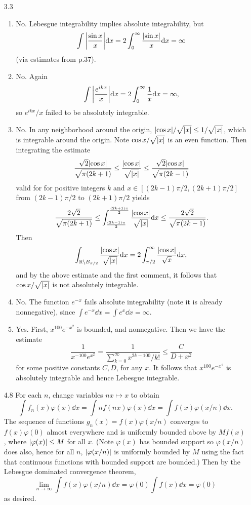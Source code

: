 \documentclass[11pt]{article}
\begin{document}
\begin{enumerate}
    \item[3.3] \begin{enumerate}
        \item No. Lebesgue integrability implies absolute integrability, but \[\int \abs{\frac{\sin x}{x}}\dd x = 2\int_0^\infty \frac{\abs{\sin x}}{x}\dd x = \infty\] (via estimates from p.37).
        \item No. Again \[\int \abs{\frac{e^{ikx}}{x}}\dd x = 2\int_0^\infty \frac{1}{x}\dd x=\infty ,\] so $e^{ikx}/x$ failed to be absolutely integrable.
        \item No. In any neighborhood around the origin, $\abs{ \cos x}/\sqrt{\abs{x}}\leq 1/\sqrt{\abs{x}}$, which is integrable around the origin. Note $\cos x/\sqrt{\abs{x}}$ is an even function. Then integrating the estimate \[\frac{\sqrt 2\abs{\cos x}}{\sqrt{\pi(2k+1)}}\leq \frac{\abs{\cos x}}{\sqrt{\abs{x}}}\leq \frac{\sqrt 2\abs{\cos x}}{\sqrt{\pi(2k-1)}}\] valid for for positive integers $k$ and $x\in [(2k-1)\pi/2,(2k+1)\pi/2]$ from $(2k-1)\pi/2$ to $(2k+1)\pi/2$ yields \[\frac{2\sqrt 2}{\sqrt{\pi(2k+1)}}\leq \int_{\frac{(2k-1)\pi}{2}}^{\frac{(2k+1)\pi}{2}}\frac{\abs{\cos x}}{\sqrt{\abs{x}}}\dd x\leq \frac{2\sqrt 2}{\sqrt{\pi(2k-1)}}.\] Then \[\int_{\mathbb{R}\setminus B_{\pi/2}} \frac{\abs{\cos x}}{\sqrt{\abs{x}}}\dd x = 2\int_{\pi/2}^\infty \frac{\abs{\cos x}}{\sqrt{x}}\dd x,\] and by the above estimate and the first comment, it follows that $\cos x /\sqrt{\abs{x}}$ is not absolutely integrable.
        \item No. The function $e^{-x}$ fails absolute integrability (note it is already nonnegative), since $\int e^{-x}\dd x = \int e^x \dd x = \infty$.
        \item Yes. First, $x^{100}e^{-x^2}$ is bounded, and nonnegative. Then we have the estimate \[\frac{1}{x^{-100}e^{x^2}} = \frac{1}{\sum_{k=0}^\infty x^{2k-100}/k!}\leq \frac{C}{D+x^2}\] for some positive constants $C,D$, for any $x$. It follows that $x^{100}e^{-x^2}$ is absolutely integrable and hence Lebesgue integrable.
    \end{enumerate}
    \item[4.8] For each $n$, change variables $nx\mapsto x$ to obtain \[\int f_n(x)\varphi(x)\dd x = \int nf(nx)\varphi(x)\dd x = \int f(x)\varphi(x/n)\dd x.\] The sequence of functions $g_n(x) = f(x)\varphi(x/n)$ converges to $f(x)\varphi(0)$ almost everywhere and is uniformly bounded above by $Mf(x)$, where $\abs{\varphi(x)}\leq M$ for all $x$. (Note $\varphi(x)$ has bounded support so $\varphi(x/n)$ does also, hence for all $n$, $\abs{\varphi(x/n)}$ is uniformly bounded by $M$ using the fact that continuous functions with bounded support are bounded.) Then by the Lebesgue dominated convergence theorem, \[\lim_{n\to\infty} \int f(x)\varphi(x/n)\dd x = \varphi(0)\int f(x)\dd x= \varphi(0)\] as desired.

\end{enumerate}
\end{document}
